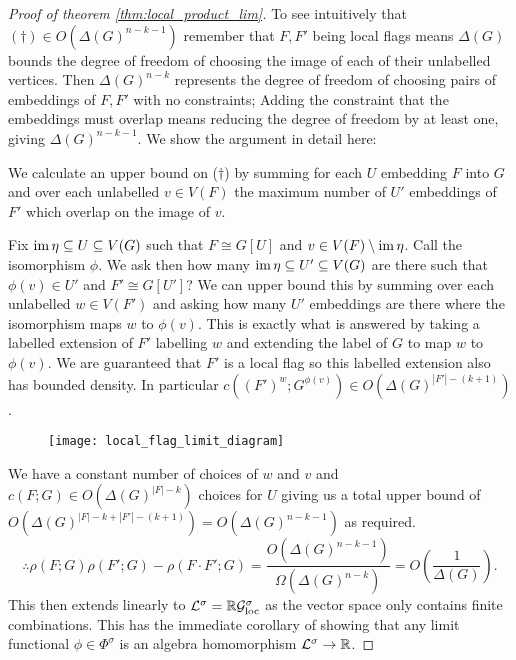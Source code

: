 \begin{proof}[Proof of theorem \ref{thm:local_product_lim}]
    To see intuitively that $(\dagger)\in O(\Delta(G)^{n-k-1})$
    remember that $F,F'$ being local flags means $\Delta(G)$
    bounds the degree of freedom of choosing the image of each of their unlabelled vertices.
    Then $\Delta(G)^{n-k}$ represents the degree
    of freedom of choosing pairs of embeddings of $F, F'$ with no constraints; Adding
    the constraint that the embeddings must overlap means reducing the degree of freedom
    by at least one, giving $\Delta(G)^{n-k-1}$. We show the argument in detail here:

    We calculate an upper bound on ($\dagger$) by summing for each $U$ embedding $F$ into $G$
    and over each unlabelled $v \in V(F)$ the maximum number of $U'$ embeddings of $F'$ which
    overlap on the image of $v$.

    Fix $\operatorname{im}\eta\subseteq U \subseteq V(G)$ such that $F \cong G[U]$ and
    $v\in V(F) \setminus \operatorname{im}\eta$. Call the isomorphism $\phi$. We ask then
    how many $\operatorname{im}\eta \subseteq U' \subseteq V(G)$ are there such that $\phi(v)\in U'$ and
    $F' \cong G[U']$? We can upper bound this by summing over each unlabelled
    $w \in V(F')$ and asking how many $U'$ embeddings are there where the isomorphism
    maps $w$ to $\phi(v)$.
    This is exactly what is answered by taking a labelled extension of $F'$ labelling
    $w$ and extending the label of $G$ to map $w$ to $\phi(v)$. We are guaranteed that
    $F'$ is a local flag so this labelled extension also has bounded density. In particular
    $c((F')^w; G^{\phi(v)})\in O(\Delta(G)^{|F'|-(k+1)})$.

    \begin{figure}[!ht]
        \centering
        \texttt{[image: local\_flag\_limit\_diagram]}
    \end{figure}

    We have a constant number of choices of $w$ and $v$ and $c(F; G) \in O(\Delta(G)^{|F|-k})$
    choices for $U$ giving us a total upper bound of
    $O(\Delta(G)^{|F|-k + |F'|-(k+1)}) = O(\Delta(G)^{n-k-1})$ as required.
    \[
        \therefore \rho(F; G)\rho(F'; G) - \rho(F\cdot F'; G)
        = \frac{O(\Delta(G)^{n-k-1})}{\Omega(\Delta(G)^{n-k})}
        = O\left(\frac{1}{\Delta(G)}\right).
    \]
    This then extends linearly to $\mathcal{L}^\sigma = \mathbb{R}\mathcal{G}_\mathrm{loc}^\sigma$ as
    the vector space only contains finite combinations.
    This has the immediate corollary of showing that any limit functional
    $\phi\in\Phi^\sigma$ is an algebra homomorphism $\mathcal{L}^\sigma \to \mathbb{R}$.
\end{proof}

